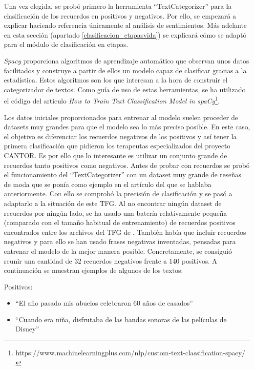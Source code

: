 Una vez elegida, se probó primero la herramienta ``TextCategorizer'' para la clasificación de los recuerdos en positivos y negativos. Por ello, se empezará a explicar haciendo referencia únicamente al análisis de sentimientos. Más adelante en esta sección (apartado \ref{clasificacion_etapasvida}) se explicará cómo se adaptó para el módulo de clasificación en etapas. 

\textit{Spacy} proporciona algoritmos de aprendizaje automático que observan unos datos facilitados y construye a partir de ellos un modelo capaz de clasificar gracias a la estadística. Estos algoritmos son los que interesan a la hora de construir el categorizador de textos. Como guía de uso de estas herramientas, se ha utilizado el código del artículo \textit{How to Train Text Classification Model in spaCy}\footnote{https://www.machinelearningplus.com/nlp/custom-text-classification-spacy/}.

Los datos iniciales proporcionados para entrenar al modelo suelen proceder de datasets muy grandes para que el modelo sea lo más preciso posible. En este caso, el objetivo es diferenciar los recuerdos negativos de los positivos y así tener la primera clasificación que pidieron los terapeutas especializados del proyecto CANTOR. Es por ello que lo interesante es utilizar un conjunto grande de recuerdos tanto positivos como negativos. Antes de probar con recuerdos se probó el funcionamiento del  ``TextCategorizer'' con un dataset muy grande de reseñas de moda que se ponía como ejemplo en el artículo del que se hablaba anteriormente. Con ello se comprobó la precisión de clasificación y se pasó a adaptarlo a la situación de este TFG. Al no encontrar ningún dataset de recuerdos por ningún lado, se ha usado una batería relativamente pequeña (comparado con el tamaño habitual de entrenamiento) de recuerdos positivos encontrados entre los archivos del TFG de \cite{lcastilla}. También había que incluir recuerdos negativos y para ello se han usado frases negativas inventadas, pensadas para entrenar el modelo de la mejor manera posible. Concretamente, se consiguió reunir una cantidad de 32 recuerdos negativos frente a 140 positivos. A continuación se muestran ejemplos de algunos de los textos:

Positivos:
\begin{itemize}
	\item ``El año pasado mis abuelos celebraron 60 años de casados''
	\item ``Cuando era niña, disfrutaba de las bandas sonoras de las películas de Disney''
\end{itemize}

